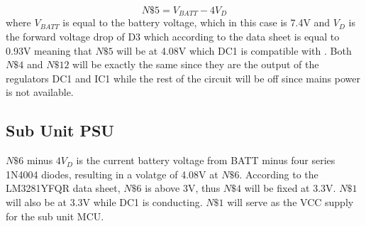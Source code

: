 \begin{equation}
  N\$5 = V_{BATT} - 4V_{D}
  \label{eq:main-N5-BATT}
\end{equation}
where $V_{BATT}$ is equal to the battery voltage, which in this case is 7.4\si{\V} and $V_{D}$ is the forward voltage drop of D3 which according to the data sheet \cite{1N4004RLG} is equal to 0.93\si{\V} meaning that $N\$5$ will be at 4.08\si{\V} which DC1 is compatible with \cite{LM3281YFQR}. Both $N\$4$ and $N\$12$ will be exactly the same since they are the output of the regulators DC1 and IC1 while the rest of the circuit will be off since mains power is not available.
\subsection{Sub Unit PSU}
$N\$6$ minus $4V_{D}$ is the current battery voltage from BATT minus four series 1N4004 diodes, resulting in a volatge of 4.08\si{\V} at $N\$6$. According to the LM3281YFQR data sheet, \cite{LM3281YFQR} $N\$6$ is above 3\si{\V}, thus $N\$4$ will be fixed at 3.3\si{\V}. $N\$1$ will also be at 3.3\si{\V} while DC1 is conducting. $N\$1$ will serve as the VCC supply for the sub unit MCU.
